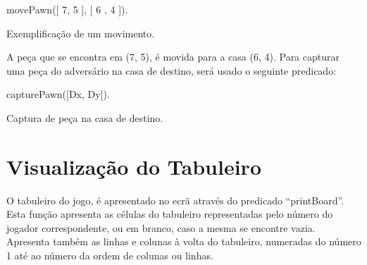 \documentclass[15pt,a4paper]{article}
\begin{document}
\begin{code}[H]
	\begin{verbatimtab}

	movePawn([ 7, 5 ], [ 6 , 4 ]).
\end{verbatimtab}
\caption{Exemplificação de um movimento.}
\end{code}
A peça que se encontra em (7, 5), é movida para a casa (6, 4).
\linebreak \linebreak
  Para capturar uma peça do adversário na casa de destino, será usado o seguinte predicado:

\begin{code}[H]
	\begin{verbatimtab}

	capturePawn([Dx, Dy]).
\end{verbatimtab}
\caption{Captura de peça na casa de destino.}
\end{code}




\section{Visualização do Tabuleiro}


O tabuleiro do jogo, é apresentado no ecrã através do predicado ``printBoard''.
Esta função apresenta as células do tabuleiro representadas pelo número do jogador correspondente, ou em branco, caso a mesma se encontre vazia.
Apresenta também as linhas e colunas à volta do tabuleiro, numeradas do número 1 até ao número da ordem de colunas ou linhas.
\end{document}
